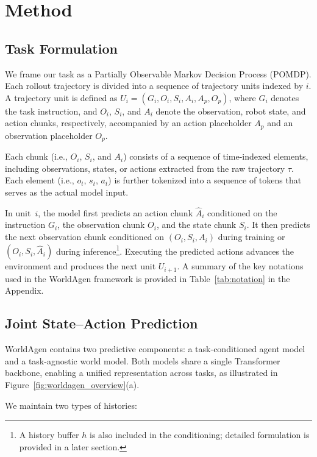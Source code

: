 \section{Method}

\subsection{Task Formulation}
\label{sec:task-formulation}

We frame our task as a Partially Observable Markov Decision Process (POMDP). Each rollout trajectory is divided into a sequence of trajectory units indexed by $i$. A trajectory unit is defined as 
$U_i = (G_i, O_i, S_i, A_i, A_p, O_p)$, 
where $G_i$ denotes the task instruction, and $O_i$, $S_i$, and $A_i$ denote the observation, robot state, and action chunks, respectively, accompanied by an action placeholder $A_p$ and an observation placeholder $O_p$.

Each chunk (i.e., $O_i$, $S_i$, and $A_i$) consists of a sequence of time-indexed elements, including observations, states, or actions extracted from the raw trajectory $\tau$. Each element (i.e., $o_t$, $s_t$, $a_t$) is further tokenized into a sequence of tokens that serves as the actual model input.

In unit~$i$, the model first predicts an action chunk $\hat{A}_i$
conditioned on the instruction $G_i$, the observation chunk $O_i$, 
and the state chunk $S_i$.
It then predicts the next observation chunk conditioned on 
$(O_i, S_i, A_i)$ during training or $(O_i, S_i, \hat{A}_i)$ during inference\footnote{A history buffer $h$ is also included in the conditioning; detailed formulation is provided in a later section.}.
Executing the predicted actions advances the environment and produces 
the next unit $U_{i+1}$.
A summary of the key notations used in the WorldAgen framework is 
provided in Table~\ref{tab:notation} in the Appendix.
\subsection{Joint State--Action Prediction}
\label{sec:join-action}

WorldAgen contains two predictive components: a task-conditioned agent model and a task-agnostic world model. Both models share a single Transformer backbone, enabling a unified representation across tasks, as illustrated in Figure~\ref{fig:worldagen_overview}(a).

We maintain two types of histories:

